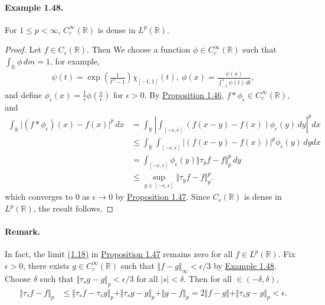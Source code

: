 \documentclass{article}
\begin{document}
\paragraph{Example 1.48.\label{example:1.48}} For $1\leq p <\infty$, $C_c^\infty(\mathbb{R})$ is dense in $L^p(\mathbb{R})$.
\begin{proof}
Let $f\in C_c(\mathbb{R})$. Then We choose a function $\phi\in C_c^\infty(\mathbb{R})$ such that $\int_\mathbb{R}\phi\,dm = 1$, for example,
\begin{align*}
	\psi(t) = \exp\left(\frac{1}{t^2-1}\right)\chi_{[-1,1]}(t),\ \phi(x) = \frac{\psi(x)}{\int_{-1}^1\psi(t)\,dt},
\end{align*}
and define $\phi_\epsilon(x) = \frac{1}{\epsilon}\phi\left(\frac{x}{\epsilon}\right)$ for $\epsilon > 0$. By \hyperref[prop:1.46]{Proposition 1.46}, $f*\phi_\epsilon\in C^\infty_c(\mathbb{R})$, and
\begin{align*}
	\int_\mathbb{R} \vert(f *\phi_\epsilon)(x) - f(x)\vert^p\,dx &= \int_\mathbb{R}\left\vert\int_{[-\epsilon,\epsilon]} (f(x-y)-f(x))\phi_\epsilon(y)\,dy\right\vert^p dx\\
	&\leq \int_\mathbb{R}\int_{[-\epsilon,\epsilon]} \tag{By Jensen's inequality} \left\vert(f(x-y)-f(x))\right\vert^p\phi_\epsilon(y)\,dydx\\
	& = \int_{[-\epsilon,\epsilon]}\phi_\epsilon(y)\Vert\tau_y f -f\Vert_p^p\,dy\\
	&\leq\sup_{y\in[-\epsilon,\epsilon]}\Vert\tau_y f - f\Vert_p^p.
\end{align*}
which converges to $0$ as $\epsilon\to 0$ by \hyperref[prop:1.47]{Proposition 1.47}. Since $C_c(\mathbb{R})$ is dense in $L^p(\mathbb{R})$, the result follows.
\end{proof}

\paragraph{Remark.} In fact, the limit \hyperref[eq:1.18]{(1.18)} in \hyperref[prop:1.47]{Proposition 1.47} remains zero for all $f\in L^p(\mathbb{R})$. Fix $\epsilon > 0$, there exists $g\in C^\infty_c(\mathbb{R})$ such that $\Vert f-g\Vert_\infty < \epsilon/3$ by \hyperref[example:1.48]{Example 1.48}. Choose $\delta$ such that $\Vert\tau_s g -g\Vert_p<\epsilon/3$ for all $\vert s\vert<\delta$. Then for all $\in(-\delta,\delta)$,
\begin{align*}
	\Vert \tau_s f - f\Vert_p &\leq \Vert \tau_s f - \tau_s g\Vert_p + \Vert \tau_s g - g\Vert_p + \Vert g - f\Vert_p = 2\Vert f - g\Vert + \Vert\tau_s g -g\Vert_p < \epsilon.
\end{align*}
\end{document}
